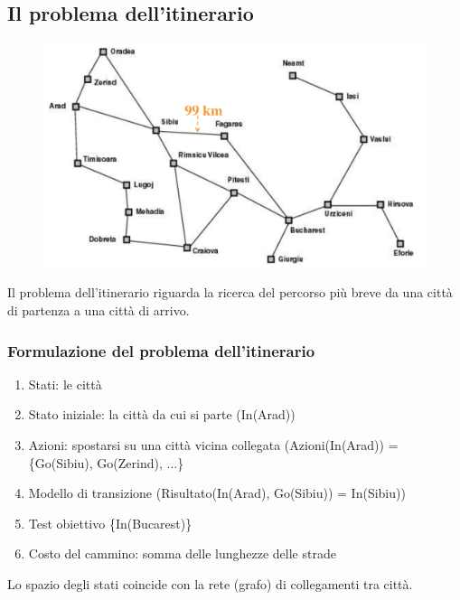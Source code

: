 \documentclass{article}
\begin{document}
\subsection{Il problema dell'itinerario}
\begin{figure}[H]
    \centering
    \includegraphics[scale=0.35]{Images/itinerarioproblema.png}
\end{figure}
Il problema dell'itinerario riguarda la ricerca del percorso più breve da una città di partenza a una città di arrivo.

\subsubsection{Formulazione del problema dell'itinerario}
\begin{enumerate}
    \item Stati: le città
    \item Stato iniziale: la città da cui si parte (In(Arad))
    \item Azioni: spostarsi su una città vicina collegata (Azioni(In(Arad)) = \{Go(Sibiu), Go(Zerind), ...\}
    \item Modello di transizione (Risultato(In(Arad), Go(Sibiu)) = In(Sibiu))
    \item Test obiettivo \{In(Bucarest)\}
    \item Costo del cammino: somma delle lunghezze delle strade
\end{enumerate}
Lo spazio degli stati coincide con la rete (grafo) di collegamenti tra città.
\end{document}
